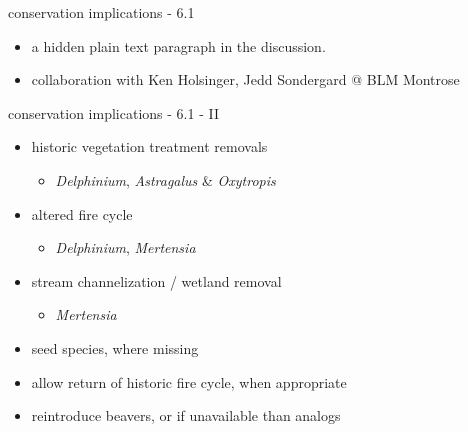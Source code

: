 \documentclass[
  ignorenonframetext,
]{beamer}
\providecommand{\tightlist}{%
  \setlength{\itemsep}{0pt}\setlength{\parskip}{0pt}}
\begin{document}
\begin{frame}{conservation implications - 6.1}
\protect\hypertarget{conservation-implications---6.1}{}
\begin{itemize}
\tightlist
\item
  a hidden plain text paragraph in the discussion.
\item
  collaboration with Ken Holsinger, Jedd Sondergard @ BLM Montrose
\end{itemize}

\end{frame}

\begin{frame}{conservation implications - 6.1 - II}
\protect\hypertarget{conservation-implications---6.1---ii}{}
\begin{itemize}
\tightlist
\item
  historic vegetation treatment removals

  \begin{itemize}
  \tightlist
  \item
    \emph{Delphinium}, \emph{Astragalus} \& \emph{Oxytropis}\\
  \end{itemize}
\item
  altered fire cycle

  \begin{itemize}
  \tightlist
  \item
    \emph{Delphinium}, \emph{Mertensia}\\
  \end{itemize}
\item
  stream channelization / wetland removal

  \begin{itemize}
  \tightlist
  \item
    \emph{Mertensia}
  \end{itemize}
\item
  seed species, where missing
\item
  allow return of historic fire cycle, when appropriate
\item
  reintroduce beavers, or if unavailable than analogs
\end{itemize}
\end{frame}
\end{document}

